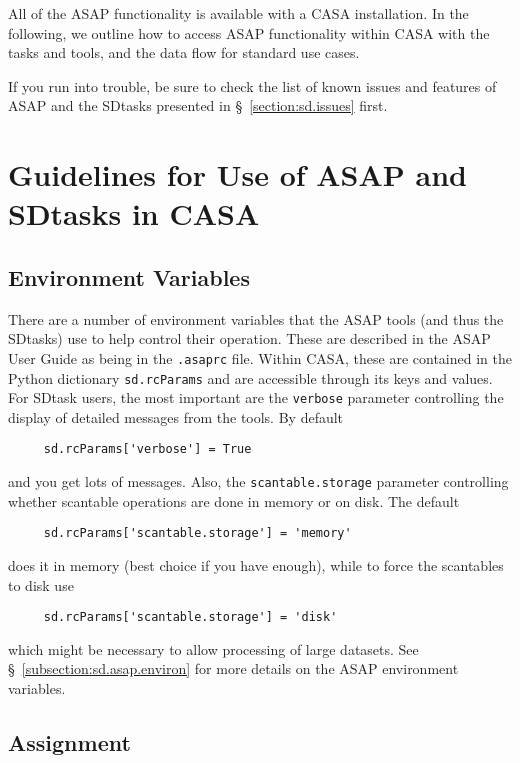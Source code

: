 All of the ASAP functionality is available with a CASA
installation.  In the following, we outline how to access ASAP
functionality within CASA with the tasks and tools,
and the data flow for standard use cases.

If you run into trouble, be sure to check the list of known issues
and features of ASAP and the SDtasks presented in 
\S~\ref{section:sd.issues} first.

\section{Guidelines for Use of ASAP and SDtasks in CASA}
\label{section:sd.intro}

\subsection{Environment Variables}
\label{section:sd.intro.env}

There are a number of environment variables that the ASAP tools
(and thus the SDtasks) use to help control their operation.
These are described in the ASAP User Guide as being in the 
{\tt .asaprc} file.  Within CASA, these are contained in the
Python dictionary {\tt sd.rcParams} and are accessible through
its keys and values.  For SDtask users, the most important are the
{\tt verbose} parameter controlling the display of detailed
messages from the tools. By default 
\small
\begin{verbatim}
     sd.rcParams['verbose'] = True
\end{verbatim}
\normalsize
and you get lots of messages.  Also, the {\tt scantable.storage}
parameter controlling whether scantable operations are done
in memory or on disk.  The default 
\small
\begin{verbatim}
     sd.rcParams['scantable.storage'] = 'memory'
\end{verbatim}
\normalsize
does it in memory (best choice if you have enough), while to
force the scantables to disk use
\small
\begin{verbatim}
     sd.rcParams['scantable.storage'] = 'disk'
\end{verbatim}
\normalsize
which might be necessary to allow processing of large datasets.
See \S~\ref{subsection:sd.asap.environ} for more details on the
ASAP environment variables.

\subsection{Assignment}
\label{section:sd.intro.ass}


